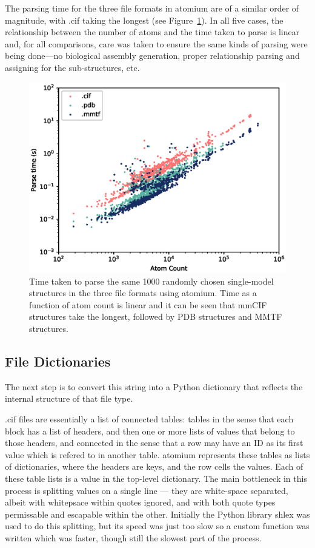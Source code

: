 The parsing time for the three file formats in atomium are of a similar order of magnitude, with .cif taking the longest (see Figure~\ref{fig:atomium-format-speed}). In all five cases, the relationship between the number of atoms and the time taken to parse is linear and, for all comparisons, care was taken to ensure the same kinds of parsing were being done—no biological assembly generation, proper relationship parsing and assigning for the sub-structures, etc.

\begin{figure}
\centering
\includegraphics[width=1.0\textwidth]{Figures/atomium-format-speed.eps}
\caption[atomium parsing.]{\label{fig:atomium-format-speed} Time taken to parse the same 1000 randomly chosen single-model structures in the three file formats using atomium. Time as a function of atom count is linear and it can be seen that mmCIF structures take the longest, followed by PDB structures and MMTF structures.}
\end{figure}

\subsection{File Dictionaries}

The next step is to convert this string into a Python dictionary that reflects the internal structure of that file type.

.cif files are essentially a list of connected tables: tables in the sense that each block has a list of headers, and then one or more lists of values that belong to those headers, and connected in the sense that a row may have an ID as its first value which is refered to in another table. atomium represents these tables as lists of dictionaries, where the headers are keys, and the row cells the values. Each of these table lists is a value in the top-level dictionary. The main bottleneck in this process is splitting values on a single line --- they are white-space separated, albeit with whitepsace within quotes ignored, and with both quote types permissable and escapable within the other. Initially the Python library shlex was used to do this splitting, but its speed was just too slow so a custom function was written which was faster, though still the slowest part of the process.

